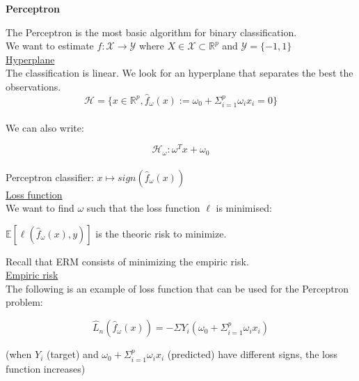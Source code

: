 {\fontsize{12pt}{22pt} \textbf{Perceptron}\par}

\vspace{5mm}

The Perceptron is the most basic algorithm for binary classification. \\

We want to estimate $f: \mathcal{X} \to \mathcal{Y}$ where $X \in \mathcal{X} \subset \mathbb{R}^p$ and $\mathcal{Y}=\{-1,1\}$ \\

\underline{Hyperplane} \\

The classification is linear. We look for an hyperplane that separates the best the observations. \\

$$\mathcal{H}=\{ x \in \mathbb{R}^p, \hat{f}_\omega(x):=\omega_0+\Sigma_{i=1}^p \omega_ix_i=0 \}$$ \\

We can also write:

$$\mathcal{H}_\omega:\omega^Tx+\omega_0$$ \\

Perceptron classifier: $x \mapsto sign(\hat{f}_\omega(x))$ \\

\underline{Loss function} \\

We want to find $\omega$ such that the loss function $\ell$ is minimised:

$\mathbb{E}[\mathcal{\ell}(\hat{f}_\omega(x),y)]$ is the theoric risk to minimize.

Recall that ERM consists of minimizing the empiric risk. \\

\underline{Empiric risk} \\

The following is an example of loss function that can be used for the Perceptron problem:

$$\widehat{L}_n(\hat{f}_\omega(x))=-\Sigma Y_i (\omega_0+\Sigma_{i=1}^p \omega_ix_i)$$

(when $Y_i$ (target) and $\omega_0+\Sigma_{i=1}^p \omega_ix_i$ (predicted) have different signs, the loss function increases)

\vspace{5mm}